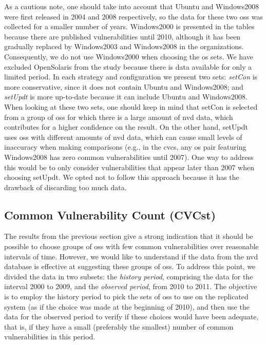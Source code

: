 As a cautious note, one should take into account that Ubuntu and Windows2008 were first released in 2004 and 2008 respectively, so the data for these two \glspl{os} was collected for a smaller number of years. 
Windows2000 is presented in the tables because there are published vulnerabilities until 2010, although it has been gradually replaced by Windows2003 and Windows2008 in the organizations. Consequently, we do not use Windows2000 when choosing the \gls{os} sets. 
We have excluded OpenSolaris from the study because there is data available for only a limited period. 
In each strategy and configuration we present two sets: \emph{setCon} is more conservative, since it does not contain Ubuntu and Windows2008; and \emph{setUpdt} is more up-to-date because it can include Ubuntu and Windows2008. 
When looking at these two sets, one should keep in mind that setCon is selected from a group of \glspl{os} for which there is a large amount of \gls{nvd} data, which contributes for a higher confidence on the result. 
On the other hand, setUpdt uses \glspl{os} with different amounts of \gls{nvd} data, which can cause small levels of inaccuracy when making comparisons (e.g., in the \gls{cvcs}, any \gls{os} pair featuring Windows2008 has zero common vulnerabilities until 2007). 
One way to address this would be to only consider vulnerabilities that appear later than 2007 when choosing setUpdt. 
We opted not to follow this approach because it has the drawback of discarding too much data.


\subsection*{Common Vulnerability Count (CVCst)} 

The results from the previous section give a strong indication that it should be possible to choose groups of \glspl{os} with few common vulnerabilities over reasonable intervals of time. 
However, we would like to understand if the data from the \gls{nvd} database is effective at suggesting these groups of \glspl{os}. 
To address this point, we divided the data in two subsets: the \emph{history period}, comprising the data for the interval 2000 to 2009, and the \emph{observed period}, from 2010 to 2011. 
The objective is to employ the history period to pick the sets of \glspl{os} to use on the replicated system (as if the choice was made at the beginning of 2010), and then use the data for the observed period to verify if these choices would have been adequate, that is, if they have a small (preferably the smallest) number of common vulnerabilities in this period.

